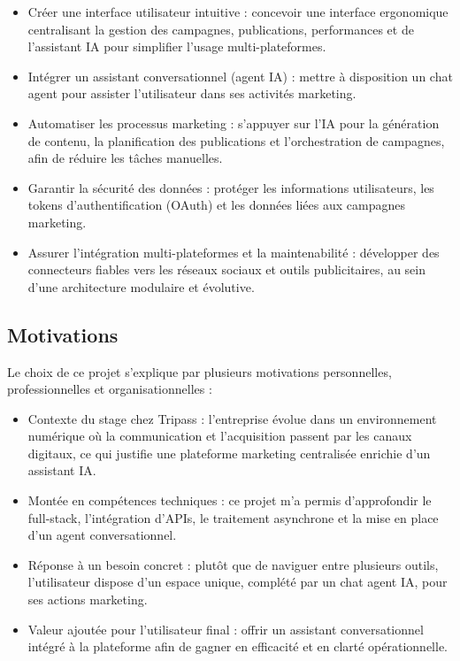 \documentclass[12pt,a4paper]{report}
\numberwithin{figure}{chapter}
\numberwithin{table}{chapter}
\begin{document}
\begin{itemize}[leftmargin=2em,itemsep=6pt]

\item Créer une interface utilisateur intuitive : concevoir une interface ergonomique centralisant la gestion des campagnes, publications, performances et de l’assistant IA pour simplifier l’usage multi-plateformes.

\item Intégrer un assistant conversationnel (agent IA) : mettre à disposition un chat agent pour assister l’utilisateur dans ses activités marketing.

\item Automatiser les processus marketing : s’appuyer sur l’IA pour la génération de contenu, la planification des publications et l’orchestration de campagnes, afin de réduire les tâches manuelles.

\item Garantir la sécurité des données : protéger les informations utilisateurs, les tokens d’authentification (OAuth) et les données liées aux campagnes marketing.

\item Assurer l’intégration multi-plateformes et la maintenabilité : développer des connecteurs fiables vers les réseaux sociaux et outils publicitaires, au sein d’une architecture modulaire et évolutive.

\end{itemize}

\subsection{Motivations}

Le choix de ce projet s’explique par plusieurs motivations personnelles, professionnelles et organisationnelles :

\begin{itemize}[leftmargin=2em,itemsep=6pt]

\item Contexte du stage chez Tripass : l’entreprise évolue dans un environnement numérique où la communication et l’acquisition passent par les canaux digitaux, ce qui justifie une plateforme marketing centralisée enrichie d’un assistant IA.

\item Montée en compétences techniques : ce projet m’a permis d’approfondir le full-stack, l’intégration d’APIs, le traitement asynchrone et la mise en place d’un agent conversationnel.

\item Réponse à un besoin concret : plutôt que de naviguer entre plusieurs outils, l’utilisateur dispose d’un espace unique, complété par un chat agent IA, pour ses actions marketing.

\item Valeur ajoutée pour l’utilisateur final : offrir un assistant conversationnel intégré à la plateforme afin de gagner en efficacité et en clarté opérationnelle.

\end{itemize}
\end{document}
